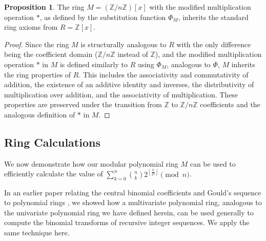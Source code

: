 \documentclass{article}
\theoremstyle{plain}
\theoremstyle{definition}
\newtheorem{proposition}{Proposition}
\newcommand{\redu}{\Phi}
\begin{document}
\begin{proposition} \label{proposition:modularring:1}
The ring \( M = (\mathbb{Z}/n\mathbb{Z})[x] \) with the modified multiplication operation \(\ast\), as defined by the substitution function \(\redu_M\), inherits the standard ring axioms from \( R = \mathbb{Z}[x] \).
\end{proposition}
\begin{proof}
Since the ring \( M \) is structurally analogous to \( R \) with the only difference being the coefficient domain (\(\mathbb{Z}/n\mathbb{Z}\) instead of \(\mathbb{Z}\)), and the modified multiplication operation \(\ast\) in \( M \) is defined similarly to \( R \) using \(\redu_M\), analogous to \(\redu\), \( M \) inherits the ring properties of \( R \). This includes the associativity and commutativity of addition, the existence of an additive identity and inverses, the distributivity of multiplication over addition, and the associativity of multiplication. These properties are preserved under the transition from \(\mathbb{Z}\) to \(\mathbb{Z}/n\mathbb{Z}\) coefficients and the analogous definition of \(\ast\) in \( M \).
\end{proof}

\subsection{Ring Calculations}
We now demonstrate how our modular polynomial ring $M$ can be used to efficiently calculate the value of $\sum_{k=0}^{n} \binom{n}{k} 2^{\left\lfloor \frac{k}{D} \right\rfloor} \pmod{n}$.

In an earlier paper relating the central binomial coefficients and Gould's sequence to polynomial rings \cite{shunia2023polynomial}, we showed how a multivariate polynomial ring, analogous to the univariate polynomial ring we have defined herein, can be used generally to compute the binomial transforms of recursive integer sequences. We apply the same technique here.
\end{document}
